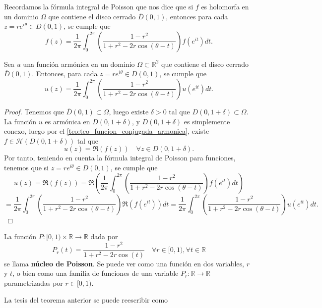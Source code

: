 Recordamos la fórmula integral de Poisson que nos dice que si $f$ es holomorfa en un dominio $\Omega$ que contiene el disco cerrado $\overline{D}(0,1)$, entonces para cada $z = re^{i\theta} \in D(0,1)$, se cumple que
\[
    f(z) = \frac{1}{2\pi} \int_0^{2\pi} \left( \frac{1 - r^2}{1 + r^2 - 2r \cos(\theta - t)} \right) f(e^{it}) dt.
\]

\begin{teorema} 
    Sea $u$ una función armónica en un dominio $\Omega \subset \mathbb{R}^2$ que contiene el disco cerrado $\overline{D}(0,1)$. Entonces, para cada $z = re^{i\theta} \in D(0,1)$, se cumple que
    \[
        u(z) = \frac{1}{2\pi} \int_0^{2\pi} \left( \frac{1 - r^2}{1 + r^2 - 2r \cos(\theta - t)} \right) u(e^{it}) dt.
    \]
\end{teorema}

\begin{proof}
    Tenemos que $\overline{D}(0,1) \subset \Omega$, luego existe $\delta > 0$ tal que $D(0,1 + \delta) \subset \Omega$. La función $u$ es armónica en $D(0,1 + \delta)$, y $D(0,1 + \delta)$ es simplemente conexo, luego por el \cref{teo:teo_funcion_conjugada_armonica}, existe $f \in \mathcal{H}(D(0,1 + \delta))$ tal que
    \[
        u(z) = \Re(f(z)) \quad \forall z \in D(0,1 + \delta).
    \]
    Por tanto, teniendo en cuenta la fórmula integral de Poisson para funciones, tenemos que si $z = re^{i\theta} \in D(0,1)$, se cumple que
    \[
        u(z) = \Re(f(z)) = \Re\left( \frac{1}{2\pi} \int_0^{2\pi} \left( \frac{1 - r^2}{1 + r^2 - 2r \cos(\theta - t)} \right) f(e^{it}) dt \right)
    \]
    \[
        = \frac{1}{2\pi} \int_0^{2\pi} \left( \frac{1 - r^2}{1 + r^2 - 2r \cos(\theta - t)} \right) \Re(f(e^{it})) dt 
        = \frac{1}{2\pi} \int_0^{2\pi} \left( \frac{1 - r^2}{1 + r^2 - 2r \cos(\theta - t)} \right) u(e^{it}) dt.
    \]
\end{proof}

\begin{definición} 
    La función $P:[0,1) \times \mathbb{R} \to \mathbb{R}$ dada por
    \[
        P_r(t) = \frac{1 - r^2}{1 + r^2 - 2r \cos(t)} \quad \forall r \in [0,1), \forall t \in \mathbb{R}
    \]
    se llama \textbf{núcleo de Poisson}. Se puede ver como una función en dos variables, $r$ y $t$, o bien como una familia de funciones de una variable $P_r:\mathbb{R} \to \mathbb{R}$ parametrizadas por $r \in [0,1)$.
\end{definición}

La tesis del teorema anterior se puede reescribir como

